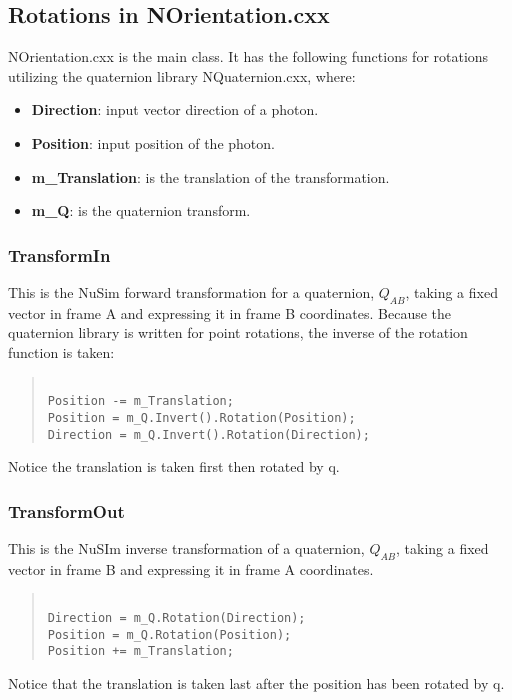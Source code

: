 \documentclass[11pt]{article}
\begin{document}
\subsection{Rotations in NOrientation.cxx}
NOrientation.cxx is the main class. It has the following functions for rotations utilizing the quaternion library NQuaternion.cxx, where:
\begin{itemize}
\item \textbf{Direction}: input vector direction of a photon.
\item \textbf{Position}: input position of the photon.
\item \textbf{m\_Translation}: is the translation of the transformation.
\item \textbf{m\_Q}: is the quaternion transform.
\end{itemize}

\subsubsection{TransformIn}
This is the NuSim forward transformation for a quaternion, $Q_{AB}$, taking a fixed vector in frame A and expressing it in frame B coordinates. Because the quaternion library is written for point rotations, the inverse of the rotation function is taken: 
\begin{quotation}
\begin{verbatim}

Position -= m_Translation;
Position = m_Q.Invert().Rotation(Position);
Direction = m_Q.Invert().Rotation(Direction);
\end{verbatim}
\end{quotation}
Notice the translation is taken first then rotated by q.
 
\subsubsection{TransformOut}
This is the NuSIm inverse transformation of a quaternion, $Q_{AB}$, taking a fixed vector in frame B and expressing it in frame A coordinates.
\begin{quotation}
\begin{verbatim}

Direction = m_Q.Rotation(Direction);
Position = m_Q.Rotation(Position);   
Position += m_Translation;
\end{verbatim}
\end{quotation}
Notice that the translation is taken last after the position has been rotated by q.
\end{document}
